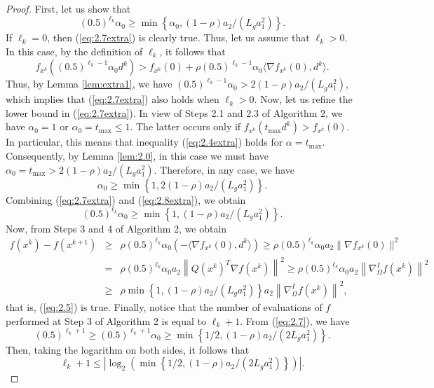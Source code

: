 \documentclass[11pt]{article}
\begin{document}
\begin{proof}
First, let us show that 
\begin{equation}
(0.5)^{\ell_{k}}\alpha_{0}\geq\min\left\{\alpha_{0}, (1-\rho)a_{2} / (L_{g}a_{1}^{2})\right\}.
\label{eq:2.7extra}
\end{equation}
If $\ell_{k}=0$, then (\ref{eq:2.7extra}) is clearly true. Thus, let us assume that $\ell_{k}>0$. In this case, by the definition of $\ell_{k}$, it follows that
\[
f_{x^{k}}\left((0.5)^{\ell_{k}-1}\alpha_{0}d^{k}\right)>f_{x^{k}}(0)+\rho (0.5)^{\ell_{k}-1}\alpha_{0}\langle\nabla f_{x^{k}}(0),d^{k}\rangle.
\]
Thus, by Lemma \ref{lem:extra1}, we have
$(0.5)^{\ell_{k}-1}\alpha_{0}>2(1-\rho)a_{2}/(L_{g}a_{1}^{2})$,
which implies that (\ref{eq:2.7extra}) also holds when $\ell_{k}>0$. Now, let us refine the lower bound in (\ref{eq:2.7extra}). In view of Steps 2.1 and 2.3 of Algorithm 2, we have $\alpha_{0}=1$ or $\alpha_{0}=t_{\max}\leq 1$. The latter occurs only if $f_{x^{k}}(t_{\max}d^{k})>f_{x^{k}}(0)$. In particular, this means that inequality (\ref{eq:2.4extra}) holds for $\alpha=t_{\max}$. Consequently, by Lemma \ref{lem:2.0}, in this case we must have $\alpha_{0}=t_{\max}>2(1-\rho)a_{2}/(L_{g}a_{1}^{2})$. Therefore, in any case, we have
\begin{equation}
\alpha_{0}\geq\min\left\{1,2(1-\rho)a_{2}/(L_{g}a_{1}^{2})\right\}.
\label{eq:2.8extra}
\end{equation}
Combining (\ref{eq:2.7extra}) and (\ref{eq:2.8extra}), we obtain
\begin{equation}
(0.5)^{\ell_{k}}\alpha_{0}\geq\min\left\{1,(1-\rho)a_{2}/(L_{g}a_{1}^{2})\right\}.
\label{eq:2.7}
\end{equation}
Now, from Steps 3 and 4 of Algorithm 2, we obtain
\begin{eqnarray*}
f(x^{k})-f(x^{k+1})
&\geq &\rho (0.5)^{\ell_{k}}\alpha_{0}\left(-\langle\nabla f_{x^{k}}(0),d^{k}\rangle\right)\geq \rho (0.5)^{\ell_{k}}\alpha_{0}a_{2}\|\nabla f_{x^{k}}(0)\|^{2}\\
& = & \rho (0.5)^{\ell_{k}}\alpha_{0}a_{2}\left\|Q(x^{k})^{T}\nabla f(x^{k})\right\|^{2}\geq \rho (0.5)^{\ell_{k}}\alpha_{0}a_{2}\left\|\nabla_{\Omega}^{I}f(x^{k})\right\|^{2}\\
&\geq &\rho\min\left\{1,(1-\rho)a_{2}/(L_{g}a_{1}^{2})\right\}a_{2}\left\|\nabla_{\Omega}^{I}f(x^{k})\right\|^{2},
\end{eqnarray*}
that is, (\ref{eq:2.5}) is true. Finally, notice that the number of evaluations of $f$ performed at Step 3 of Algorithm 2 is equal to $\ell_{k}+1$. From (\ref{eq:2.7}), we have
\[
(0.5)^{\ell_{k}+1}\geq (0.5)^{\ell_{k}+1}\alpha_{0}\geq\min\left\{1/2,(1-\rho)a_{2}/(2L_{g}a_{1}^{2})\right\}.
\]
Then, taking the logarithm on both sides, it follows that
\[
\ell_{k}+1 \leq \left|\log_{2}\left( \min\left\{1/2,(1-\rho)a_{2}/(2L_{g}a_{1}^{2})\right\} \right)\right|.
\]
\end{proof}
\end{document}
